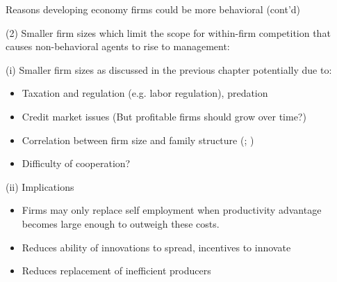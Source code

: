 \documentclass[aspectratio=169, 10pt, handout]{beamer}
\newenvironment{wideitemize}{\itemize\addtolength{\itemsep}{10pt}}{\enditemize}
\begin{document}
\begin{frame}{Reasons developing economy firms could be more behavioral (cont'd)}

\begin{wideitemize}

	\item[(2)] Smaller firm sizes which limit the scope for within-firm competition that causes non-behavioral agents to rise to management:

    \smallskip

	\begin{wideitemize}

		\item[(i)] Smaller firm sizes as discussed in the previous chapter potentially due to:

		\begin{itemize}

			\item Taxation and regulation (e.g. labor regulation), predation

			\item Credit market issues (But profitable firms should grow over time?)

			\item Correlation between firm size and family structure (\cite{ilias2006families}; \cite{bertrand2008mixing})

            \item Difficulty of cooperation?
		
		\end{itemize}

		\item[(ii)] Implications
	
		
		\begin{itemize}
		
			\item Firms may only replace self employment when productivity advantage becomes large enough to outweigh these costs.

			\item Reduces ability of innovations to spread, incentives to innovate

			\item Reduces replacement of inefficient producers

		\end{itemize}	

	\end{wideitemize}


\end{wideitemize}
\end{frame}
\end{document}
